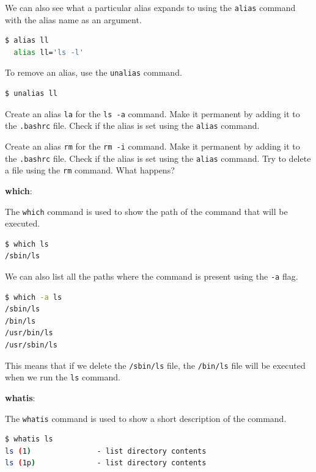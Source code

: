 We can also see what a particular alias expands to using the \texttt{alias} command with the alias name as an argument.

\begin{lstlisting}[language=bash]
  $ alias ll
  alias ll='ls -l'
\end{lstlisting}

To remove an alias, use the \texttt{unalias} command.

\begin{lstlisting}[language=bash]
  $ unalias ll
\end{lstlisting}

\begin{exercise}
  Create an alias \texttt{la} for the \texttt{ls -a} command.
  Make it permanent by adding it to the \texttt{.bashrc} file.
  Check if the alias is set using the \texttt{alias} command.
\end{exercise}

\begin{exercise}
  Create an alias \texttt{rm} for the \texttt{rm -i} command.
  Make it permanent by adding it to the \texttt{.bashrc} file.
  Check if the alias is set using the \texttt{alias} command.
  Try to delete a file using the \texttt{rm} command.
  What happens?
\end{exercise}

\textbf{which}:

The \texttt{which} command is used to show the path of the command that will be executed.

\begin{lstlisting}[language=bash]
$ which ls
/sbin/ls
\end{lstlisting}

We can also list all the paths where the command is present using the \texttt{-a} flag.

\begin{lstlisting}[language=bash]
$ which -a ls
/sbin/ls
/bin/ls
/usr/bin/ls
/usr/sbin/ls
\end{lstlisting}

This means that if we delete the \texttt{/sbin/ls} file, the \texttt{/bin/ls} file will be executed when we run the \texttt{ls} command.

\textbf{whatis}:

The \texttt{whatis} command is used to show a short description of the command.

\begin{lstlisting}[language=bash]
$ whatis ls
ls (1)               - list directory contents
ls (1p)              - list directory contents
\end{lstlisting}

